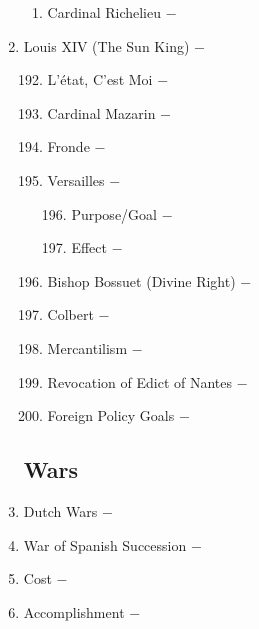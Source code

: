 \documentclass[12pt]{article}
\begin{document}
\begin{enumerate}
\begin{enumerate}[label=\arabic{*}.]
\item Cardinal Richelieu $-$ 

\end{enumerate}
\setcounter{enumi}{190}

\item Louis XIV (The Sun King) $-$

\begin{enumerate}[label=\arabic{*}.]
\setcounter{enumii}{191}
\item L'\'etat, C'est Moi $-$

\item Cardinal Mazarin $-$ 

\item Fronde $-$ 

\item Versailles $-$

\begin{enumerate}[label=\arabic{*}.]
\setcounter{enumiii}{195}

\item Purpose/Goal $-$

\item Effect $-$

\end{enumerate}
\setcounter{enumii}{197}

\item Bishop Bossuet (Divine Right) $-$

\item Colbert $-$ 

\item Mercantilism $-$ 

\item Revocation of Edict of Nantes $-$ 

\item Foreign Policy Goals $-$ 

\end{enumerate}

\subsection{Wars}
\setcounter{enumi}{202}

\item Dutch Wars $-$

\item War of Spanish Succession $-$

\item Cost $-$ 

\item Accomplishment $-$ 


\end{enumerate}
\end{document}
